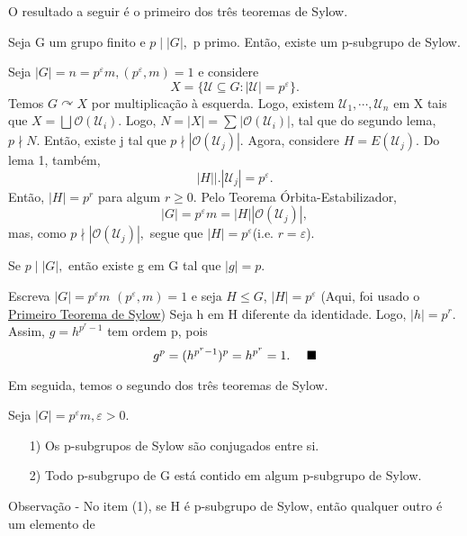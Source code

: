 \documentclass[algebra_notes.tex]{subfiles}
\begin{document}
O resultado a seguir é o primeiro dos três teoremas de Sylow.
\hypertarget{sylow_one}{
	\begin{theorem*}
		Seja G um grupo finito e \(p\mid |G|,\) p primo. Então, existe um p-subgrupo de Sylow.
	\end{theorem*}
}
\begin{proof*}
	Seja \(|G| = n = p^{\varepsilon }m, (p^{\varepsilon }, m) = 1\) e considere
	\[
		X = \{\mathcal{U}\subseteq{G}: |\mathcal{U}| = p^{\varepsilon }\}.
	\]
	Temos \(G \curvearrowright X\) por multiplicação à esquerda. Logo, existem
	\(\mathcal{U}_{1}, \cdots, \mathcal{U}_{n}\) em X tais que \(X = \bigsqcup_{}^{}{\mathcal{O}(\mathcal{U}_{i})}\).
	Logo, \(N = |X| = \sum\limits_{}^{}|\mathcal{O}(\mathcal{U}_{i})|\), tal que do segundo lema,
	\(p\nmid N.\) Então, existe j tal que \(p\nmid|\mathcal{O}(\mathcal{U}_{j})|\).
	Agora, considere \(H = E(\mathcal{U}_{j}).\) Do lema 1, também,
	\[
		|H|\biggl|\biggr. |\mathcal{U}_{j}| = p^{\varepsilon }.
	\]
	Então, \(|H| = p^{r}\) para algum \(r\geq 0\). Pelo Teorema Órbita-Estabilizador,
	\[
		|G| = p^{\varepsilon }m = |H||\mathcal{O}(\mathcal{U}_{j})|,
	\]
	mas, como \(p\nmid|\mathcal{O}(\mathcal{U}_{j})|,\) segue que \(|H| = p^{\varepsilon }\)(i.e. \(r=\varepsilon \)). \qedsymbol
\end{proof*}
\begin{crl*}
	Se \(p\mid |G|,\) então existe g em G tal que \(|g| = p.\)
\end{crl*}
\begin{proof*}
	Escreva \(|G| = p^{\varepsilon }m\) \((p^{\varepsilon }, m) = 1\) e seja \(H\leq G\),
	\(|H| = p^{\varepsilon }\) (Aqui, foi usado o \hyperlink{sylow_one}{Primeiro Teorema de Sylow})
	Seja h em H diferente da identidade. Logo, \(|h| = p^{r}.\) Assim, \(g = h^{p^{r}-1}\)
	tem ordem p, pois
	\[
		g^{p} = (h^{p^{r}-1})^{p} = h^{p^{r}} = 1.\quad\text{ $\blacksquare$}
	\]
\end{proof*}
Em seguida, temos o segundo dos três teoremas de Sylow.
\hypertarget{sylow_two}{
	\begin{theorem*}
		Seja \(|G| = p^{\varepsilon }m, \varepsilon >0\).
		\begin{itemize}
			\item[1)] Os p-subgrupos de Sylow são conjugados entre si.
			\item[2)] Todo p-subgrupo de G está contido em algum p-subgrupo de Sylow.
		\end{itemize}
	\end{theorem*}}
Observação - No item (1), se H é p-subgrupo de Sylow, então qualquer outro é um elemento de
\end{document}
